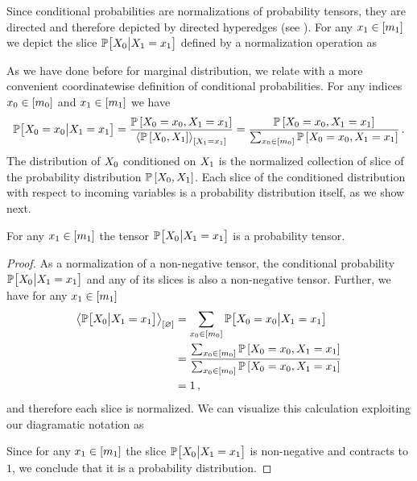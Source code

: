 Since conditional probabilities are normalizations of probability tensors, they are directed and therefore depicted by directed hyperedges (see ).
For any $x_{1}\in[m_{1}]$ we depict the slice $\mathbb{P}\big[X_{0}\big|X_{1}=x_{1}\big]$ defined by a normalization operation as
\begin{center}
    
\end{center}

As we have done before for marginal distribution, we relate  with a more convenient coordinatewise definition of conditional probabilities.
For any indices $x_{0}\in[m_{0}]$ and $x_{1}\in[m_{1}]$ we have
\begin{align*}
    \mathbb{P}\big[X_{0}=x_{0}\big|X_{1}=x_{1}\big]
    = \frac{\mathbb{P}\left[X_{0}=x_{0},X_{1}=x_{1}\right]}{\left\langle \mathbb{P}\left[X_{0},X_{1}\right]\right\rangle_{\left[ X_{1}=x_{1} \right]}}
    = \frac{\mathbb{P}\left[X_{0}=x_{0},X_{1}=x_{1}\right]}{\sum_{x_{0}\in[m_{0}]} \mathbb{P}\left[X_{0}=x_{0},X_{1}=x_{1}\right]} \, .
\end{align*}
The distribution of $X_{0}$ conditioned on $X_{1}$ is the normalized collection of slice of the probability distribution $\mathbb{P}\left[X_{0},X_{1}\right]$.
Each slice of the conditioned distribution with respect to incoming variables is a probability distribution itself, as we show next.

\begin{theorem}
    \label{the:conditionalContraction}
    For any $x_{1}\in[m_{1}]$ the tensor $\mathbb{P}\big[X_{0}\big|X_{1}=x_{1}\big]$ is a probability tensor.
\end{theorem}
\begin{proof}
    As a normalization of a non-negative tensor, the conditional probability $\mathbb{P}\big[X_{0}\big|X_{1}=x_{1}\big]$ and any of its slices is also a non-negative tensor.
    Further, we have for any $x_{1}\in[m_{1}]$
    \begin{align*}
        \left\langle \mathbb{P}\big[X_{0}\big|X_{1}=x_{1}\big]\right\rangle_{\left[ \varnothing \right]}
        & = \sum_{x_{0}\in[m_{0}]} \mathbb{P}\big[X_{0}=x_{0}\big|X_{1}=x_{1}\big] \\
        &= \frac{\sum_{x_{0}\in[m_{0}]}\mathbb{P}\left[X_{0}=x_{0},X_{1}=x_{1}\right]}{\sum_{x_{0}\in[m_{0}]}\mathbb{P}\left[X_{0}=x_{0},X_{1}=x_{1}\right]} \\
        &= 1 \, ,
    \end{align*}
    and therefore each slice is normalized.
    We can visualize this calculation exploiting our diagramatic notation as
    \begin{center}
        
    \end{center}
    Since for any $x_{1}\in[m_{1}]$ the slice $\mathbb{P}\big[X_{0}\big|X_{1}=x_{1}\big]$ is non-negative and contracts to $1$, we conclude that it is a probability distribution.
\end{proof}

